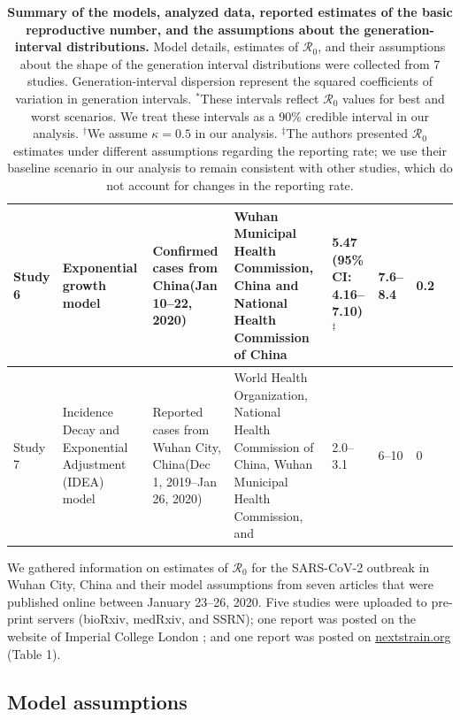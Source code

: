 \documentclass[12pt]{article}
\newcommand{\Ro}{\ensuremath{{\mathcal R}_{0}}\xspace}
\begin{document}
{\begin{landscape}
\begin{table}[!th]
\begin{center}
\begin{tabular}{l|L{2cm}|L{3.2cm}|L{2.8cm}|L{2.5cm}|L{2.4cm}|L{2.7cm}|L{2cm}}
\hline
Study 6 & Exponential growth model & Confirmed cases from China\newline (Jan 10--22, 2020) & Wuhan
Municipal Health Commission, China and National Health Commission of China & 5.47 (95\% CI: 4.16--7.10)$^\ddagger$ & 7.6--8.4 & 0.2 & \cite{zhaoncov} \\
\hline
Study 7 & Incidence Decay and Exponential Adjustment (IDEA) model & Reported cases from Wuhan City, China\newline (Dec 1, 2019--Jan 26, 2020) & World	Health Organization, National Health Commission of China, Wuhan Municipal	Health Commission, and \cite{huang2020clinical} & 2.0--3.1 & 6--10 & 0 & \cite{majumderncov} \\
\hline
\end{tabular}
\end{center}
\caption{
\textbf{Summary of the models, analyzed data, reported estimates of the basic reproductive number, and the assumptions about the generation-interval distributions.}
Model details, estimates of \Ro, and their assumptions about the shape of the generation interval distributions were collected from 7 studies.
Generation-interval dispersion represent the squared coefficients of variation in generation intervals.
$^\ast$These intervals reflect \Ro values for best and worst scenarios. We treat these intervals as a 90\% credible interval in our analysis.
$^\dagger$We assume $\kappa = 0.5$ in our analysis.
$^\ddagger$The authors presented \Ro estimates under different assumptions regarding the reporting rate; we use their baseline scenario in our analysis to remain consistent with other studies, which do not account for changes in the reporting rate.
}
\end{table}
\end{landscape}
\clearpage
}

We gathered information on estimates of \Ro for the SARS-CoV-2 outbreak in Wuhan City, China and their model assumptions from seven articles that were published online between January 23--26, 2020.
Five studies \citep{liuncov, majumderncov, readncov, riouncov, zhaoncov} were uploaded to pre-print servers (bioRxiv, medRxiv, and SSRN); one report was posted on the website of Imperial College London \citep{imaincov}; and one report was posted on \url{nextstrain.org} \citep{bedfordncov} (Table 1).

\subsection{Model assumptions}
\end{document}

